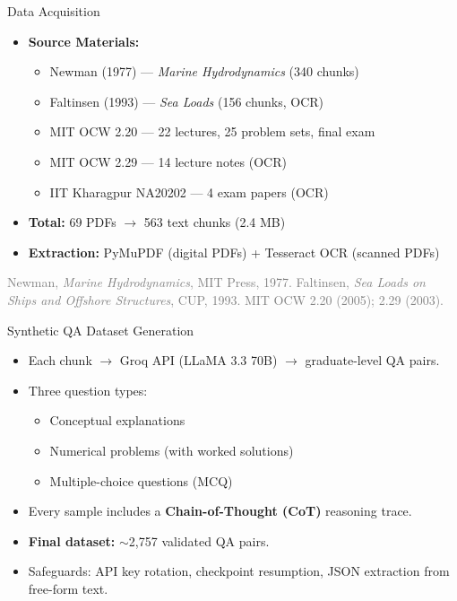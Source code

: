 \documentclass[10pt]{beamer}
\begin{document}
\begin{frame}{Data Acquisition}
\large
\begin{itemize}
    \item \textbf{Source Materials:}
    \begin{itemize}
        \item Newman (1977) — \textit{Marine Hydrodynamics} (340 chunks)
        \item Faltinsen (1993) — \textit{Sea Loads} (156 chunks, OCR)
        \item MIT OCW 2.20 — 22 lectures, 25 problem sets, final exam
        \item MIT OCW 2.29 — 14 lecture notes (OCR)
        \item IIT Kharagpur NA20202 — 4 exam papers (OCR)
    \end{itemize}
    \vspace{0.2cm}
    \item \textbf{Total:} 69 PDFs $\to$ 563 text chunks (2.4 MB)
    \vspace{0.2cm}
    \item \textbf{Extraction:} PyMuPDF (digital PDFs) + Tesseract OCR (scanned PDFs)
\end{itemize}
\vspace{\fill}
{\tiny \textcolor{gray}{Newman, \textit{Marine Hydrodynamics}, MIT Press, 1977. \quad Faltinsen, \textit{Sea Loads on Ships and Offshore Structures}, CUP, 1993. \quad MIT OCW 2.20 (2005); 2.29 (2003).}}
\end{frame}

\begin{frame}{Synthetic QA Dataset Generation}
\large
\begin{itemize}
    \item Each chunk $\to$ Groq API (LLaMA 3.3 70B) $\to$ graduate-level QA pairs.
    \vspace{0.2cm}
    \item Three question types:
    \begin{itemize}
        \item Conceptual explanations
        \item Numerical problems (with worked solutions)
        \item Multiple-choice questions (MCQ)
    \end{itemize}
    \vspace{0.2cm}
    \item Every sample includes a \textbf{Chain-of-Thought (CoT)} reasoning trace.
    \vspace{0.2cm}
    \item \textbf{Final dataset:} $\sim$2,757 validated QA pairs.
    \vspace{0.2cm}
    \item Safeguards: API key rotation, checkpoint resumption, JSON extraction from free-form text.
\end{itemize}
\end{frame}
\end{document}
